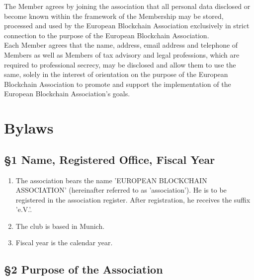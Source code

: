 \documentclass{article}
\begin{document}
The Member agrees by joining the association that all personal data disclosed or become known within the framework of the Membership may be stored, processed and used by the European Blockchain Association exclusively in strict connection to the purpose of the European Blockchain Association. \\
Each Member agrees that the name, address, email address and telephone of Members as well as Members of tax advisory and legal professions, which are required to professional secrecy, may be disclosed and allow them to use the same, solely in the interest of orientation on the purpose of the European Blockchain Association to promote and support the implementation of the European Blockchain Association's goals.

\newpage

\section{Bylaws}

\subsection{\S 1 Name, Registered Office, Fiscal Year}

\begin{enumerate}
	\item The association bears the name 'EUROPEAN BLOCKCHAIN ASSOCIATION' (hereinafter referred to as 'association'). 
	He is to be registered in the association register. 
	After registration, he receives the suffix 'e.V.'.
	\item The club is based in Munich.
	\item Fiscal year is the calendar year.
\end{enumerate}

\subsection{\S 2 Purpose of the Association}
\end{document}
